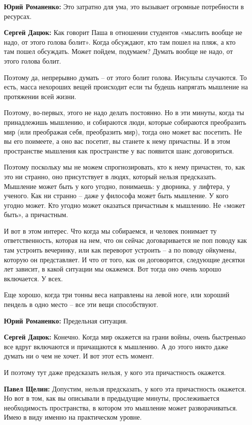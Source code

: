 \textbf{Юрий Романенко:} Это затратно для ума, это вызывает огромные потребности в
ресурсах.

\textbf{Сергей Дацюк:} Как говорит Паша в отношении студентов «мыслить вообще не надо,
от этого голова болит». Когда обсуждают, кто там пошел на пляж, а кто там пошел
обсуждать. Может пойдем, подумаем? Думать вообще не надо, от этого голова
болит.

Поэтому да, непрерывно думать – от этого болит голова. Инсульты случаются. То
есть, масса нехороших вещей происходит если ты будешь напрягать мышление на
протяжении всей жизни.

Поэтому, во-первых, этого не надо делать постоянно. Но в эти минуты, когда ты
принадлежишь мышлению, и собираются люди, которые собираются преобразить мир
(или преображая себя, преобразить мир), тогда оно может вас посетить. Не вы его
поимеете, а оно вас посетит, вы станете к нему причастны. И в этом пространстве
мышления как пространстве у вас появится шанс договориться.

Поэтому поскольку мы не можем спрогнозировать, кто к нему причастен, то, как
это ни странно, оно присутствует в людях, который нельзя предсказать. Мышление
может быть у кого угодно, понимаешь: у дворника, у лифтера, у ученого. Как ни
странно – даже у философа может быть мышление. У кого угодно может. Кто угодно
может оказаться причастным к мышлению. Не «может быть», а причастным.

И вот в этом интерес. Что когда мы собираемся, и человек понимает ту
ответственность, которая на нем, что он сейчас договаривается не поп поводу как
там устроить вечеринку, или как переворот устроить – а по поводу ойкумены,
которую он представляет. И что от того, как он договорится, следующие десятки
лет зависит, в какой ситуации мы окажемся. Вот тогда оно очень хорошо
включается. У всех.

Еще хорошо, когда три тонны веса направлены на левой ноге, или хороший пендель
в одно место – все эти вещи способствуют.

\textbf{Юрий Романенко:} Предельная ситуация.

\textbf{Сергей Дацюк:} Конечно. Когда мир окажется на грани войны, очень быстренько все
вдруг включаются и причащаются к мышлению. А до этого никто даже думать ни о
чем не хочет. И вот этот есть момент.

И поэтому тут даже предсказать нельзя, у кого эта причастность окажется.

\textbf{Павел Щелин:} Допустим, нельзя предсказать, у кого эта причастность окажется. Но
вот в том, как вы описывали в предыдущие минуты, прослеживается необходимость
пространства, в котором это мышление может разворачиваться. Имею в виду именно
на практическом уровне.

